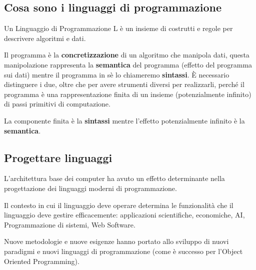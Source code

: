 \documentclass[12pt,a4paper]{article}
\begin{document}
\clearpage

\subsection{Cosa sono i linguaggi di programmazione}
Un Linguaggio di Programmazione L è un insieme di costrutti e regole per descrivere algoritmi e dati.

Il programma è la \textbf{concretizzazione} di un algoritmo che manipola dati, questa manipolazione rappresenta la \textbf{semantica} del programma (effetto del programma sui dati) mentre il programma in sè lo chiameremo \textbf{sintassi}. È necessario distinguere i due, oltre che per avere strumenti diversi per realizzarli, perché il programma è una rappresentazione finita di un insieme (potenzialmente infinito) di passi primitivi di computazione.

La componente finita è la \textbf{sintassi} mentre l'effetto potenzialmente infinito è la \textbf{semantica}.

\subsection{Progettare linguaggi}
L'architettura base dei computer ha avuto un effetto determinante nella progettazione dei linguaggi moderni di programmazione.

Il contesto in cui il linguaggio deve operare determina le funzionalità che il linguaggio deve gestire efficacemente: applicazioni scientifiche, economiche, AI, Programmazione di sistemi, Web Software.

Nuove metodologie e nuove esigenze hanno portato allo sviluppo di nuovi paradigmi e nuovi linguaggi di programmazione (come è successo per l'Object Oriented Programming).
\end{document}
